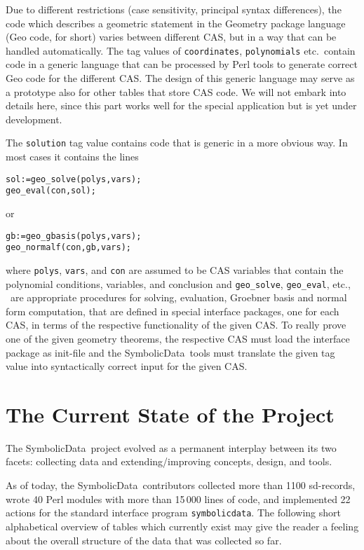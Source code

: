 \documentclass[11pt,a4paper]{article}
\newcommand{\SD}{{\sc Symbolic\-Data}}
\begin{document}
Due to different restrictions (case sensitivity, principal syntax
differences), the code which describes a geometric statement in the
{\sc Geometry} package language (Geo code, for short) varies between
different CAS, but in a way that can be handled automatically.  The
tag values of {\tt coordinates}, {\tt polynomials} etc.\ contain code
in a generic language that can be processed by Perl tools to generate
correct Geo code for the different CAS. The design of this generic
language may serve as a prototype also for other tables that store CAS
code. We will not embark into details here, since this part works well
for the special application but is yet under development.

The {\tt solution} tag value contains code that is generic in a more
obvious way.  In most cases it contains the lines 
\begin{verbatim}
sol:=geo_solve(polys,vars);
geo_eval(con,sol);
\end{verbatim}
or 
\begin{verbatim}
gb:=geo_gbasis(polys,vars);
geo_normalf(con,gb,vars);
\end{verbatim}
where {\tt polys}, {\tt vars}, and {\tt con} are assumed to be CAS
variables that contain the polynomial conditions, variables, and
conclusion and {\tt geo\_solve}, {\tt geo\_eval}, etc., \ are
appropriate procedures for 
solving, evaluation, Groebner basis and normal form computation,
that are defined in special interface packages, one for each CAS, in
terms of the respective functionality of the given CAS.  To really
prove one of the given geometry theorems, the respective CAS must load
the interface package as init-file and the \SD\ tools must translate
the given tag value into syntactically correct input for the given
CAS.

\section{The Current State of the Project}

The \SD\ project evolved as a permanent interplay between its two
facets: collecting data and extending/improving concepts, design, and
tools. 

As of today, the \SD\ contributors collected more than 1100
sd-records, wrote 40 Perl modules with more than 15\,000 lines of
code, and implemented 22 actions for the standard interface program
{\tt symbolicdata}.  The following short alphabetical overview of
tables which currently exist may give the reader a feeling about the
overall structure of the data that was collected so far.
\end{document}
